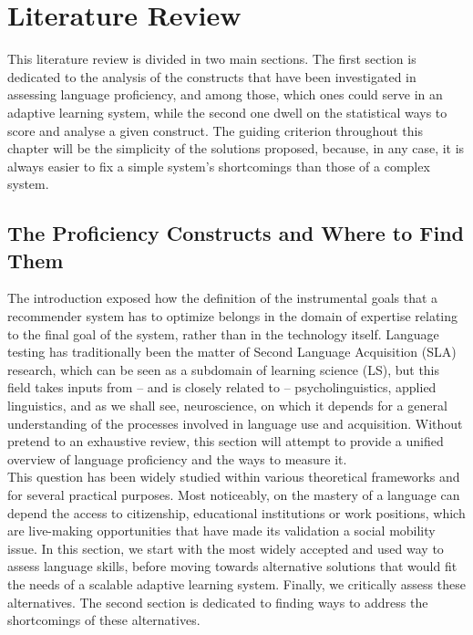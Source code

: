 \chapter{Literature Review}

This literature review is divided in two main sections. The first section is dedicated to the analysis of the constructs that have been investigated in assessing language proficiency, and among those, which ones could serve in an adaptive learning system, while the second one dwell on the statistical ways to score and analyse a given construct. The guiding criterion throughout this chapter will be the simplicity of the solutions proposed, because, in any case, it is always easier to fix a simple system's shortcomings than those of a complex system.

\section{The Proficiency Constructs and Where to Find Them}
The introduction exposed how the definition of the instrumental goals that a recommender system has to optimize belongs in the domain of expertise relating to the final goal of the system, rather than in the technology itself. Language testing has traditionally been the matter of Second Language Acquisition (SLA) research, which can be seen as a subdomain of learning science (LS), but this field takes inputs from – and is closely related to – psycholinguistics, applied linguistics, and as we shall see, neuroscience, on which it depends for a general understanding of the processes involved in language use and acquisition. Without pretend to an exhaustive review, this section will attempt to provide a unified overview of language proficiency and the ways to measure it. \\
This question has been widely studied within various theoretical frameworks and for several practical purposes. Most noticeably, on the mastery of a language can depend the access to citizenship, educational institutions or work positions, which are live-making opportunities that have made its validation a social mobility issue. In this section, we start with the most widely accepted and used way to assess language skills, before moving towards alternative solutions that would fit the needs of a scalable adaptive learning system. Finally, we critically assess these alternatives. The second section is dedicated to finding ways to address the shortcomings of these alternatives.

